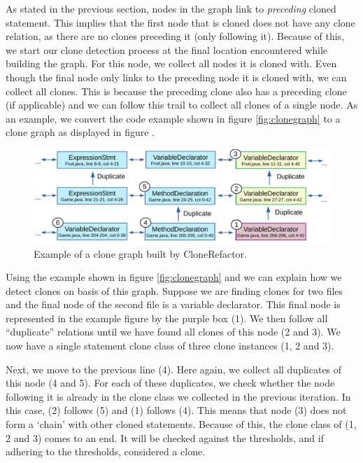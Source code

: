 As stated in the previous section, nodes in the graph link to \textit{preceding} cloned statement. This implies that the first node that is cloned does not have any clone relation, as there are no clones preceding it (only following it). Because of this, we start our clone detection process at the final location encountered while building the graph. For this node, we collect all nodes it is cloned with. Even though the final node only links to the preceding node it is cloned with, we can collect all clones. This is because the preceding clone also has a preceding clone (if applicable) and we can follow this trail to collect all clones of a single node. As an example, we convert the code example shown in figure \ref{fig:clonegraph} to a clone graph as displayed in figure \label{fig:clonegraph2}.

\begin{figure}[H]
  \centering
  \includegraphics[width=1\columnwidth]{img/CodeGraphExample}
  \caption{Example of a clone graph built by CloneRefactor.}
  \label{fig:clonegraph2}
\end{figure}

Using the example shown in figure \ref{fig:clonegraph} and \label{fig:clonegraph2} we can explain how we detect clones on basis of this graph. Suppose we are finding clones for two files and the final node of the second file is a variable declarator. This final node is represented in the example figure by the purple box (1). We then follow all ``duplicate'' relations until we have found all clones of this node (2 and 3). We now have a single statement clone class of three clone instances (1, 2 and 3).

Next, we move to the previous line (4). Here again, we collect all duplicates of this node (4 and 5). For each of these duplicates, we check whether the node following it is already in the clone class we collected in the previous iteration. In this case, (2) follows (5) and (1) follows (4). This means that node (3) does not form a `chain' with other cloned statements. Because of this, the clone class of (1, 2 and 3) comes to an end. It will be checked against the thresholds, and if adhering to the thresholds, considered a clone.

